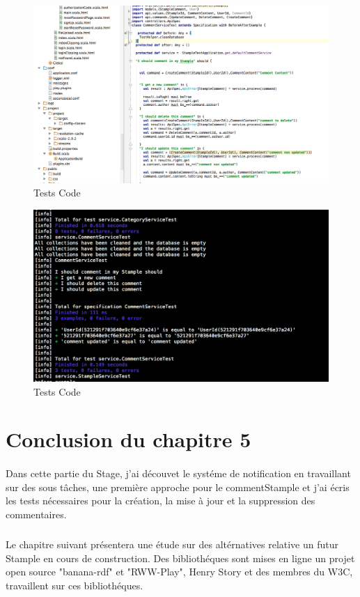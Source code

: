 \begin{figure}[H]
        \centering
                \centering
                \includegraphics[width=\textwidth]{test.png}
               \caption{Tests Code}
		\label{fig:Test Code}
\end{figure}
\begin{figure}[H]
        \centering
                \centering
                \includegraphics[width=\textwidth]{code.png}
               \caption{Tests Code}
		\label{fig:Test Code}
\end{figure}
\section{Conclusion du chapitre 5}
\paragraph{}
Dans cette partie du Stage, j'ai découvet le systéme de notification en travaillant sur des sous tâches, une première approche pour le commentStample et j'ai écris les tests nécessaires pour la création, la mise à jour et la suppression des commentaires.
\subparagraph{}
Le chapitre suivant présentera une étude sur des altérnatives relative un futur Stample en cours de construction.
Des bibliothéques sont mises en ligne un projet open source "banana-rdf" et "RWW-Play", Henry Story et des membres du W3C, travaillent sur ces bibliothéques.